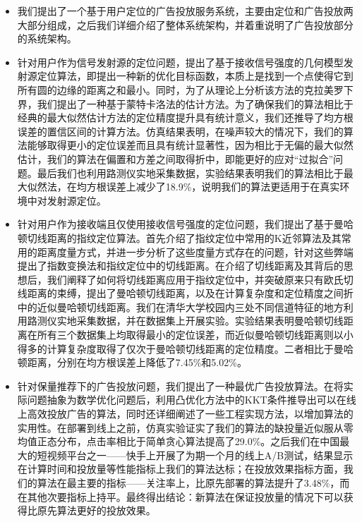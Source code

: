 \begin{itemize}
	
	\item 我们提出了一个基于用户定位的广告投放服务系统，主要由定位和广告投放两大部分组成，之后我们详细介绍了整体系统架构，并着重说明了广告投放部分的系统架构。
	
	\item 针对用户作为信号发射源的定位问题，提出了基于接收信号强度的几何模型发射源定位算法，即提出一种新的优化目标函数，本质上是找到一个点使得它到所有圆的边缘的距离之和最小。同时，为了从理论上分析该方法的克拉美罗下界，我们提出了一种基于蒙特卡洛法的估计方法。为了确保我们的算法相比于经典的最大似然估计方法的定位精度提升具有统计意义，我们还推导了均方根误差的置信区间的计算方法。仿真结果表明，在噪声较大的情况下，我们的算法能够取得更小的定位误差而且具有统计显著性，因为相比于无偏的最大似然估计，我们的算法在偏置和方差之间取得折中，即能更好的应对“过拟合”问题。最后我们也利用路测仪实地采集数据，实验结果表明我们的算法相比于最大似然法，在均方根误差上减少了18.9\%，说明我们的算法更适用于在真实环境中对发射源定位。
	
	\item 针对用户作为接收端且仅使用接收信号强度的定位问题，我们提出了基于曼哈顿切线距离的指纹定位算法。首先介绍了指纹定位中常用的K近邻算法及其常用的距离度量方式，并进一步分析了这些度量方式存在的问题，针对这些弊端提出了指数变换法和指纹定位中的切线距离。在介绍了切线距离及其背后的思想后，我们阐释了如何将切线距离应用于指纹定位中，并突破原来只有欧氏切线距离的束缚，提出了曼哈顿切线距离，以及在计算复杂度和定位精度之间折中的近似曼哈顿切线距离。我们在清华大学校园内三处不同信道特征的地方利用路测仪实地采集数据，并在数据集上开展实验。实验结果表明曼哈顿切线距离在所有三个数据集上均取得最小的定位误差，而近似曼哈顿切线距离则以小得多的计算复杂度取得了仅次于曼哈顿切线距离的定位精度。二者相比于曼哈顿距离，分别在均方根误差上降低了7.45\%和5.02\%。
	
	\item 针对保量推荐下的广告投放问题，我们提出了一种最优广告投放算法。在将实际问题抽象为数学优化问题后，利用凸优化方法中的KKT条件推导出可以在线上高效投放广告的算法，同时还详细阐述了一些工程实现方法，以增加算法的实用性。在部署到线上之前，仿真实验证实了我们的算法的缺投量近似服从零均值正态分布，点击率相比于简单贪心算法提高了29.0\%。之后我们在中国最大的短视频平台之一——快手上开展了为期一个月的线上A/B测试，结果显示在计算时间和投放量等性能指标上我们的算法达标；在投放效果指标方面，我们的算法在最主要的指标——关注率上，比原先部署的算法提升了3.48\%，而在其他次要指标上持平。最终得出结论：新算法在保证投放量的情况下可以获得比原先算法更好的投放效果。
\end{itemize}

